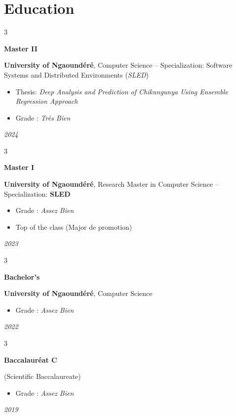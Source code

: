 \documentclass[10pt, letterpaper]{article}
\newenvironment{highlights}{
	\begin{itemize}[
		topsep=0.10 cm,
		parsep=0.10 cm,
		partopsep=0pt,
		itemsep=0pt,
		leftmargin=0.4 cm + 10pt
		]
	}{
	\end{itemize}
} %
\newenvironment{threecolentry}[3][]{
	\onecolentry
	\def\thirdColumn{#3}
	\setcolumnwidth{2cm, \fill, 4.5 cm} %
	\begin{paracol}{3}
		{\raggedright #2} \switchcolumn
	}{
		\switchcolumn \raggedleft \thirdColumn
	\end{paracol}
	\endonecolentry
} %
\begin{document}
	\section{Education}
	\begin{threecolentry}{\textbf{Master II}}{\textit{2024}}
		\textbf{University of Ngaoundéré}, Computer Science – Specialization: Software Systems and Distributed Environments (\textit{SLED})
		\begin{highlights}
			\item Thesis: \textit{Deep Analysis and Prediction of Chikungunya Using Ensemble Regression Approach}
			\item Grade : \textit{Très Bien}
		\end{highlights}
	\end{threecolentry}
	\vspace{0.2 cm}
	\begin{threecolentry}{\textbf{Master I}}{\textit{2023}}
		\textbf{University of Ngaoundéré}, Research Master in Computer Science – Specialization: \textbf{SLED}
		\begin{highlights}
			\item Grade : \textit{Assez Bien}
			\item Top of the class (Major de promotion)
		\end{highlights}
	\end{threecolentry}
	\vspace{0.2 cm}
	\begin{threecolentry}{\textbf{Bachelor's}}{\textit{2022}} %
		\textbf{University of Ngaoundéré}, Computer Science
		\begin{highlights}
			\item Grade : \textit{Assez Bien}
		\end{highlights}
	\end{threecolentry}
	\vspace{0.2 cm}
	\begin{threecolentry}{\textbf{Baccalauréat C}}{\textit{2019}} %
		(Scientific Baccalaureate) %
		\begin{highlights}
			\item Grade : \textit{Assez Bien}
		\end{highlights}
	\end{threecolentry}
	
\end{document}
